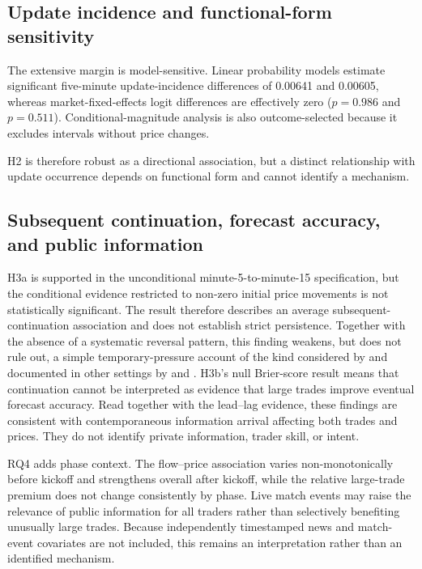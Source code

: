 \subsection{Update incidence and functional-form sensitivity}
\label{sec:discussion-margin}

The extensive margin is model-sensitive. Linear probability models estimate significant five-minute update-incidence differences of 0.00641 and 0.00605, whereas market-fixed-effects logit differences are effectively zero ($p=0.986$ and $p=0.511$). Conditional-magnitude analysis is also outcome-selected because it excludes intervals without price changes.

H2 is therefore robust as a directional association, but a distinct relationship with update occurrence depends on functional form and cannot identify a mechanism.

\subsection{Subsequent continuation, forecast accuracy, and public information}

H3a is supported in the unconditional minute-5-to-minute-15 specification, but the conditional evidence restricted to non-zero initial price movements is not statistically significant. The result therefore describes an average subsequent-continuation association and does not establish strict persistence. Together with the absence of a systematic reversal pattern, this finding weakens, but does not rule out, a simple temporary-pressure account of the kind considered by \citet{allengale1992manipulation} and documented in other settings by \citet{aggarwalwu2006manipulation} and \citet{griffinshams2020untethered}. H3b's null Brier-score result means that continuation cannot be interpreted as evidence that large trades improve eventual forecast accuracy. Read together with the lead--lag evidence, these findings are consistent with contemporaneous information arrival affecting both trades and prices. They do not identify private information, trader skill, or intent.

RQ4 adds phase context. The flow--price association varies non-monotonically before kickoff and strengthens overall after kickoff, while the relative large-trade premium does not change consistently by phase. Live match events may raise the relevance of public information for all traders rather than selectively benefiting unusually large trades. Because independently timestamped news and match-event covariates are not included, this remains an interpretation rather than an identified mechanism.

